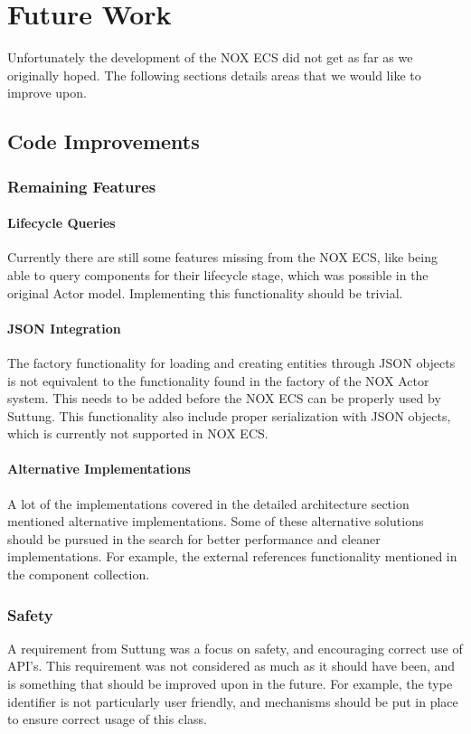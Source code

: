 \chapter{Future Work}
\label{chap:future_work}
Unfortunately the development of the NOX ECS did not get as far as we originally hoped.
The following sections details areas that we would like to improve upon.

\section{Code Improvements}
\subsection{Remaining Features}
\subsubsection{Lifecycle Queries}
Currently there are still some features missing from the NOX ECS, like being able to query
components for their lifecycle stage, which was possible in the original Actor model.
Implementing this functionality should be trivial.

\subsubsection{JSON Integration}
The factory functionality for loading and creating entities through JSON objects
is not equivalent to the functionality found in the factory of the NOX Actor system.
This needs to be added before the NOX ECS can be properly used by Suttung.
This functionality also include proper serialization with JSON objects, which
is currently not supported in NOX ECS.

\subsubsection{Alternative Implementations}
A lot of the implementations covered in the detailed architecture section mentioned alternative
implementations. Some of these alternative solutions should be pursued in the search for
better performance and cleaner implementations. For example, the external references functionality
mentioned in the component collection.

\subsection{Safety}
A requirement from Suttung was a focus on safety, and encouraging correct use of API's.
This requirement was not considered as much as it should have been, and is something that
should be improved upon in the future.
For example, the type identifier is not particularly user friendly, and mechanisms should
be put in place to ensure correct usage of this class.

